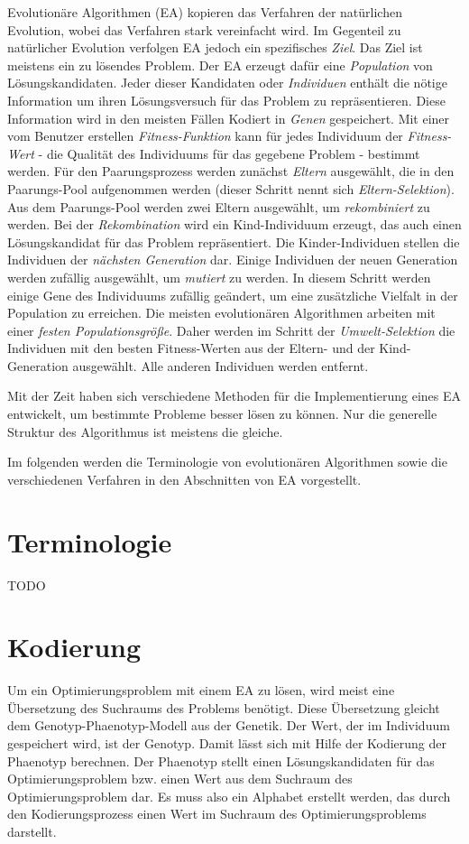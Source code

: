 Evolutionäre Algorithmen (\acs{EA}) kopieren das Verfahren der natürlichen Evolution, wobei das Verfahren stark vereinfacht wird. Im Gegenteil zu natürlicher Evolution verfolgen EA jedoch ein spezifisches \textit{Ziel}. Das Ziel ist meistens ein zu lösendes Problem. Der EA erzeugt dafür eine \textit{Population} von Lösungskandidaten. Jeder dieser Kandidaten oder \textit{Individuen} enthält die nötige Information um ihren Lösungsversuch für das Problem zu repräsentieren. Diese Information wird in den meisten Fällen Kodiert in \textit{Genen} gespeichert. Mit einer vom Benutzer erstellen \textit{Fitness-Funktion} kann für jedes Individuum der \textit{Fitness-Wert} - die Qualität des Individuums für das gegebene Problem - bestimmt werden. Für den Paarungsprozess werden zunächst \textit{Eltern} ausgewählt, die in den Paarungs-Pool aufgenommen werden (dieser Schritt nennt sich \textit{Eltern-Selektion}). Aus dem Paarungs-Pool werden zwei Eltern ausgewählt, um \textit{rekombiniert} zu werden. Bei der \textit{Rekombination} wird ein Kind-Individuum erzeugt, das auch einen Lösungskandidat für das Problem repräsentiert. Die Kinder-Individuen stellen die Individuen der \textit{nächsten Generation} dar. Einige Individuen der neuen Generation werden zufällig ausgewählt, um \textit{mutiert} zu werden. In diesem Schritt werden einige Gene des Individuums zufällig geändert, um eine zusätzliche Vielfalt in der Population zu erreichen. Die meisten evolutionären Algorithmen arbeiten mit einer \textit{festen Populationsgröße}. Daher werden im Schritt der \textit{Umwelt-Selektion} die Individuen mit den besten Fitness-Werten aus der Eltern- und der Kind-Generation ausgewählt. Alle anderen Individuen werden entfernt. 

Mit der Zeit haben sich verschiedene Methoden für die Implementierung eines EA entwickelt, um bestimmte Probleme besser lösen zu können. Nur die generelle Struktur des Algorithmus ist meistens die gleiche. %

Im folgenden werden die Terminologie von evolutionären Algorithmen sowie die verschiedenen Verfahren in den Abschnitten von EA vorgestellt. 

\section{Terminologie}
TODO

\section{Kodierung}
Um ein Optimierungsproblem mit einem \acs{EA} zu lösen, wird meist eine Übersetzung des Suchraums des Problems benötigt. Diese Übersetzung gleicht dem Genotyp-Phaenotyp-Modell aus der Genetik. Der Wert, der im Individuum gespeichert wird, ist der Genotyp. Damit lässt sich mit Hilfe der Kodierung der Phaenotyp berechnen. Der Phaenotyp stellt einen Lösungskandidaten für das Optimierungsproblem bzw. einen Wert aus dem Suchraum des Optimierungsproblem dar. Es muss also ein Alphabet erstellt werden, das durch den Kodierungsprozess einen Wert im Suchraum des Optimierungsproblems darstellt. 

